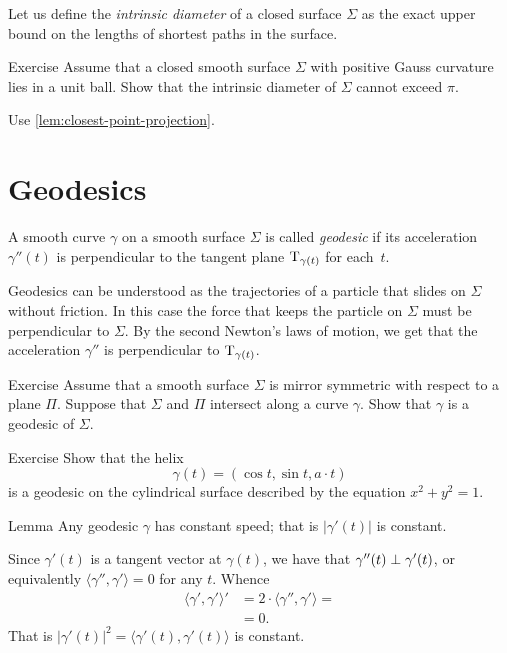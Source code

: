 Let us define the \emph{intrinsic diameter} of a closed surface $\Sigma$ as the exact upper bound on the lengths of shortest paths in the surface.

\begin{thm}{Exercise}\label{ex:intrinsic-diameter}
Assume that a closed smooth surface $\Sigma$ with positive Gauss curvature lies in a unit ball.
Show that the intrinsic diameter of $\Sigma$ cannot exceed $\pi$.
\end{thm}

 Use \ref{lem:closest-point-projection}.


\section*{Geodesics}

A smooth curve $\gamma$ on a smooth surface $\Sigma$ is called \emph{geodesic} if its acceleration $\gamma''(t)$ is perpendicular to the tangent plane $\mathrm{T}_{\gamma(t)}$ for each~$t$.

Geodesics can be understood as the trajectories of a particle that slides on $\Sigma$ without friction.
In this case the force that keeps the particle on $\Sigma$ must be perpendicular to $\Sigma$.
By the second Newton's laws of motion,
we get that the acceleration $\gamma''$ is perpendicular to $\mathrm{T}_{\gamma(t)}$.

\begin{thm}{Exercise}\label{ex:reflection-geodesic}
Assume that a smooth surface $\Sigma$ is mirror symmetric with respect to  a plane $\Pi$.
Suppose that $\Sigma$ and $\Pi$ intersect along a curve $\gamma$.
Show that $\gamma$ is a geodesic of $\Sigma$.
\end{thm}

\begin{thm}{Exercise}\label{ex:helix=geodesic}
Show that the helix 
\[\gamma(t)=(\cos t,\sin t, a\cdot t)\]
is a geodesic on the cylindrical surface described by the equation $x^2+y^2=1$.
\end{thm}


\begin{thm}{Lemma}\label{lem:constant-speed}
Any geodesic $\gamma$ has constant speed; that is $|\gamma'(t)|$ is constant.
\end{thm}

Since $\gamma'(t)$ is a tangent vector at $\gamma(t)$,
we have that $\gamma''(t)\z\perp\gamma'(t)$, or equivalently $\langle\gamma'',\gamma'\rangle=0$ for any $t$.
Whence 
\begin{align*}
\langle\gamma',\gamma'\rangle'&=2\cdot \langle\gamma'',\gamma'\rangle=
\\
&=0.
\end{align*}
That is $|\gamma'(t)|^2=\langle\gamma'(t),\gamma'(t)\rangle$ is constant.
\qeds

